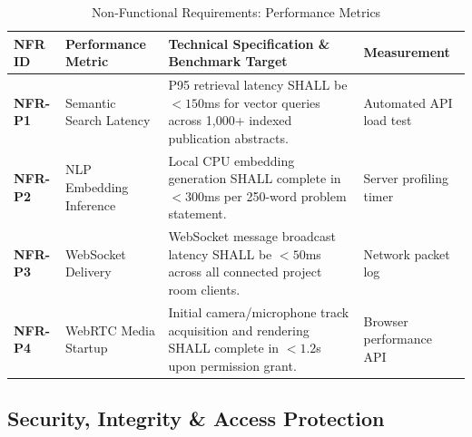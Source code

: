 \documentclass[10.5pt,a4paper]{article}
\begin{document}
\begin{table}[h]
\centering
\small
\begin{tabularx}{\linewidth}{|l|l|X|l|}
\hline
\rowcolor{headergray} \textbf{NFR ID} & \textbf{Performance Metric} & \textbf{Technical Specification \& Benchmark Target} & \textbf{Measurement} \\ \hline
\textbf{NFR-P1} & Semantic Search Latency & P95 retrieval latency SHALL be $< 150$ms for vector queries across 1,000+ indexed publication abstracts. & Automated API load test \\ \hline
\textbf{NFR-P2} & NLP Embedding Inference & Local CPU embedding generation SHALL complete in $< 300$ms per 250-word problem statement. & Server profiling timer \\ \hline
\textbf{NFR-P3} & WebSocket Delivery & WebSocket message broadcast latency SHALL be $< 50$ms across all connected project room clients. & Network packet log \\ \hline
\textbf{NFR-P4} & WebRTC Media Startup & Initial camera/microphone track acquisition and rendering SHALL complete in $< 1.2$s upon permission grant. & Browser performance API \\ \hline
\end{tabularx}
\caption{Non-Functional Requirements: Performance Metrics}
\end{table}

\subsection{Security, Integrity \& Access Protection}
\end{document}

